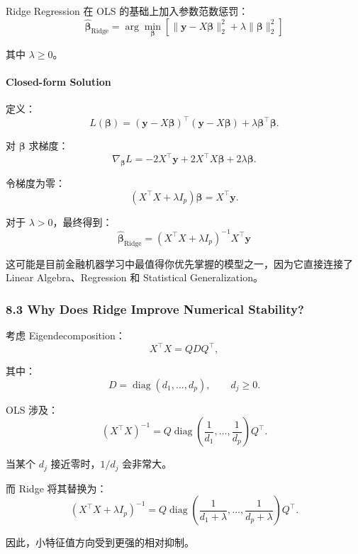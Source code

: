 Ridge Regression 在 OLS 的基础上加入参数范数惩罚：
\[\boxed{
\hat{\boldsymbol\beta}_{\mathrm{Ridge}}
=
\arg\min_{\boldsymbol\beta}
\left[
\|\boldsymbol y-X\boldsymbol\beta\|_2^2
+
\lambda\|\boldsymbol\beta\|_2^2
\right]
}\]

其中 \(\lambda\geq0\)。

\hypertarget{part-4-63-0001-closed-form-solution}{%
\paragraph{Closed-form Solution}\label{part-4-63-0001-closed-form-solution}}

定义：
\[L(\boldsymbol\beta)
=
(\boldsymbol y-X\boldsymbol\beta)^\top
(\boldsymbol y-X\boldsymbol\beta)
+
\lambda\boldsymbol\beta^\top\boldsymbol\beta.\]

对 \(\boldsymbol\beta\) 求梯度：
\[\nabla_{\boldsymbol\beta}L
=
-2X^\top\boldsymbol y
+
2X^\top X\boldsymbol\beta
+
2\lambda\boldsymbol\beta.\]

令梯度为零：
\[(X^\top X+\lambda I_p)\boldsymbol\beta
=
X^\top\boldsymbol y.\]

对于 \(\lambda>0\)，最终得到：
\[\boxed{
\hat{\boldsymbol\beta}_{\mathrm{Ridge}}
=
(X^\top X+\lambda I_p)^{-1}
X^\top\boldsymbol y
}\]

这可能是目前金融机器学习中最值得你优先掌握的模型之一，因为它直接连接了 Linear Algebra、Regression 和 Statistical Generalization。

\hypertarget{part-4-63-0001-why-does-ridge-improve-numerical-stability}{%
\subsubsection{8.3 Why Does Ridge Improve Numerical Stability?}\label{part-4-63-0001-why-does-ridge-improve-numerical-stability}}

考虑 Eigendecomposition：
\[X^\top X=QDQ^\top,\]

其中：
\[D=\operatorname{diag}(d_1,\ldots,d_p),
\qquad d_j\geq0.\]

OLS 涉及：
\[(X^\top X)^{-1}
=
Q\operatorname{diag}
\left(
\frac1{d_1},\ldots,\frac1{d_p}
\right)Q^\top.\]

当某个 \(d_j\) 接近零时，\(1/d_j\) 会非常大。

而 Ridge 将其替换为：
\[(X^\top X+\lambda I_p)^{-1}
=
Q\operatorname{diag}
\left(
\frac1{d_1+\lambda},\ldots,
\frac1{d_p+\lambda}
\right)Q^\top.\]

因此，小特征值方向受到更强的相对抑制。

